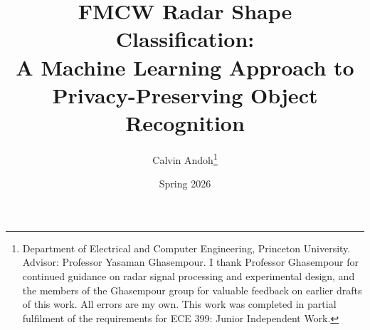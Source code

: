 \documentclass[letterpaper,11pt,leqno]{article}
\begin{document}
\title{FMCW Radar Shape Classification:\\A Machine Learning Approach to\\Privacy-Preserving Object Recognition}

\author{Calvin Andoh\thanks{Department of Electrical and Computer Engineering, Princeton University. Advisor: Professor Yasaman Ghasempour. I thank Professor Ghasempour for continued guidance on radar signal processing and experimental design, and the members of the Ghasempour group for valuable feedback on earlier drafts of this work. All errors are my own. This work was completed in partial fulfilment of the requirements for ECE 399: Junior Independent Work.}}

\date{Spring 2026}

\end{document}
